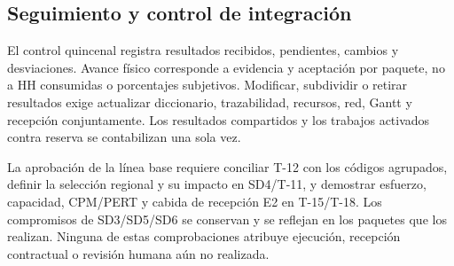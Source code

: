 \subsection{Seguimiento y control de integración}
El control quincenal registra resultados recibidos, pendientes, cambios y desviaciones. Avance físico corresponde a evidencia y aceptación por paquete, no a HH consumidas o porcentajes subjetivos. Modificar, subdividir o retirar resultados exige actualizar diccionario, trazabilidad, recursos, red, Gantt y recepción conjuntamente. Los resultados compartidos y los trabajos activados contra reserva se contabilizan una sola vez.

La aprobación de la línea base requiere conciliar T-12 con los códigos agrupados, definir la selección regional y su impacto en SD4/T-11, y demostrar esfuerzo, capacidad, CPM/PERT y cabida de recepción E2 en T-15/T-18. Los compromisos de SD3/SD5/SD6 se conservan y se reflejan en los paquetes que los realizan. Ninguna de estas comprobaciones atribuye ejecución, recepción contractual o revisión humana aún no realizada.